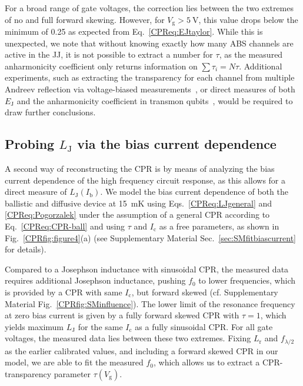 For a broad range of gate voltages, the correction lies between the two extremes of no and full forward skewing.
%
However, for $V_\text{g}>\SI{5}{\volt}$, this value drops below the minimum of 0.25 as expected from Eq.~\ref{CPReq:EJtaylor}.
%
While this is unexpected, we note that without knowing exactly how many ABS channels are active in the JJ, it is not possible to extract a number for $\tau$, as the measured anharmonicity coefficient only returns information on $\sum\tau_i=N\tau$.
%
Additional experiments, such as extracting the transparency for each channel from multiple Andreev reflection via voltage-biased measurements~\cite{scheerConductionChannelTransmissions1997,goffmanConductionChannelsInAsAl2017,bretheauTunnellingSpectroscopyAndreev2017a,pandeyAndreevReflectionBallistic2019}, or direct measures of both $E_\text{J}$ and the anharmonicity coefficient in transmon qubits~\cite{larsenSemiconductorNanowireBasedSuperconductingQubit2015, delangeRealizationMicrowaveQuantum2015, casparisGatemonBenchmarkingTwoQubit2016a,casparisSuperconductingGatemonQubit2018}, would be required to draw further conclusions.


\subsection{Probing $L_\text{J}$ via the bias current dependence}

A second way of reconstructing the CPR is by means of analyzing the bias current dependence of the high frequency circuit response, as this allows for a direct measure of $L_\text{J}(I_\text{b})$.
%
We model the bias current dependence of both the ballistic and diffusive device at \SI{15}{\milli\kelvin} using Eqs.~\ref{CPReq:LJgeneral} and \ref{CPReq:Pogorzalek} under the assumption of a general CPR according to Eq.~\ref{CPReq:CPR-ball} and using $\tau$ and $I_\text{c}$ as a free parameters, as shown in Fig.~\ref{CPRfig:figure4}(a) (see Supplementary Material Sec.~\ref{sec:SMfitbiascurrent} for details).

Compared to a Josephson inductance with sinusoidal CPR, the measured data requires additional Josephson inductance, pushing $f_0$ to lower frequencies, which is provided by a CPR with same $I_\text{c}$, but forward skewed (cf. Supplementary Material Fig.~\ref{CPRfig:SMinfluence}).
%
The lower limit of the resonance frequency at zero bias current is given by a fully forward skewed CPR with $\tau=1$, which yields maximum $L_\text{J}$ for the same $I_\text{c}$ as a fully sinusoidal CPR.
%
For all gate voltages, the measured data lies between these two extremes.
%
Fixing $L_\text{r}$ and $f_{\lambda/2}$ as the earlier calibrated values, and including a forward skewed CPR in our model, we are able to fit the measured $f_0$, which allows us to extract a CPR-transparency parameter $\tau(V_\text{g})$.

